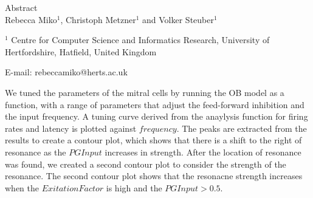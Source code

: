 \documentclass[11pt]{report}
\begin{document}
{\Huge Abstract}\\

Rebecca Miko$^1$, Christoph Metzner$^1$ and Volker Steuber$^1$

$^1$ Centre for Computer Science and Informatics Research, University of Hertfordshire, Hatfield, United Kingdom 

E-mail: rebeccamiko@herts.ac.uk


We tuned the parameters of the mitral cells by running the OB model as a function, with a range of parameters that adjust the feed-forward inhibition and the input frequency.
A tuning curve derived from the anaylysis function for firing rates and latency is plotted against $frequency$. 
The peaks are extracted from the results to create a contour plot, which shows that there is a shift to the right of resonance as the $PGInput$ increases in strength.
After the location of resonance was found, we created a second contour plot to consider the strength of the resonance.
The second contour plot shows that the resonacne strength increases when the $Exitation Factor$ is high and the $PGInput > 0.5$.  
\end{document}

